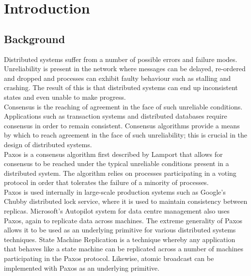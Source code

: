 \chapter{Introduction}

\section{Background}

Distributed systems suffer from a number of possible errors and failure modes. Unreliability is present in the network where messages can be delayed, re-ordered and dropped and processes can exhibit faulty behaviour such as stalling and crashing. The result of this is that distributed systems can end up inconsistent states and even unable to make progress. \\

Consensus is the reaching of agreement in the face of such unreliable conditions. Applications such as transaction systems and distributed databases require consensus in order to remain consistent. Consensus algorithms provide a means by which to reach agreement in the face of such unreliability; this is crucial in the design of distributed systems. \\

Paxos is a consensus algorithm first described by Lamport \cite{Lamport:1998:PP:279227.279229} that allows for consensus to be reached under the typical unreliable conditions present in a distributed system. The algorithm relies on processes participating in a voting protocol in order that tolerates the failure of a minority of processes. \\

Paxos is used internally in large-scale production systems such as Google's Chubby \cite{Burrows:2006:CLS:1298455.1298487} distributed lock service, where it is used to maintain consistency between replicas. Microsoft's Autopilot \cite{autopilot-automatic-data-center-management} system for data centre management also uses Paxos, again to replicate data across machines. The extreme generality of Paxos allows it to be used as an underlying primitive for various distributed systems techniques. State Machine Replication \cite{Schneider:1990:IFS:98163.98167} is a technique whereby any application that behaves like a state machine can be replicated across a number of machines participating in the Paxos protocol. Likewise, atomic broadcast \cite{Rodrigues:2003:ABA:942591.942742} can be implemented with Paxos as an underlying primitive. \\

